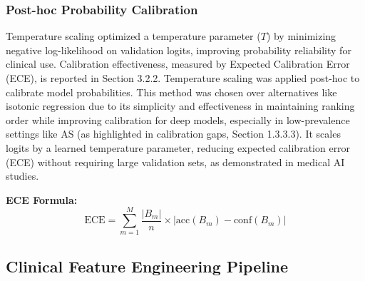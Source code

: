 \documentclass[12pt, a4paper]{article}
\begin{document}
\subsubsection{Post-hoc Probability Calibration}
Temperature scaling optimized a temperature parameter (\( T \)) by minimizing negative log-likelihood on validation logits, improving probability reliability for clinical use. Calibration effectiveness, measured by Expected Calibration Error (ECE), is reported in Section 3.2.2. Temperature scaling was applied post-hoc to calibrate model probabilities. This method was chosen over alternatives like isotonic regression due to its simplicity and effectiveness in maintaining ranking order while improving calibration for deep models, especially in low-prevalence settings like AS (as highlighted in calibration gaps, Section 1.3.3.3). It scales logits by a learned temperature parameter, reducing expected calibration error (ECE) without requiring large validation sets, as demonstrated in medical AI studies.

\textbf{ECE Formula:}
\[ \text{ECE} = \sum_{m=1}^{M} \frac{|B_m|}{n} \times |\text{acc}(B_m) - \text{conf}(B_m)| \]

\subsection{Clinical Feature Engineering Pipeline}
\end{document}
